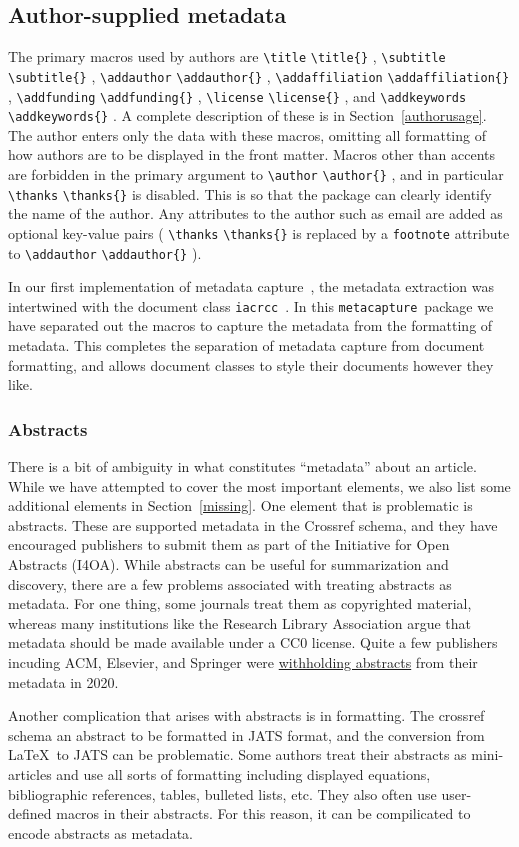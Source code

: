 \documentclass{article}
\newcommand{\pkgname}{\texttt{metacapture}}
\newcommand{\cmd}[2][]{%
  \def\FirstArg{#1}%
  \ifx\FirstArg\empty%
    \texttt{\textbackslash{}#2}%
  \else%
    \texttt{\textbackslash{}#2\{#1\}}%
  \fi
}
\newcommand{\pkg}[1]{\texttt{#1}}
\begin{document}
\subsection{Author-supplied metadata}
The primary macros used by authors are \cmd{title},
\cmd{subtitle}, \cmd{addauthor}, \cmd{addaffiliation},
\cmd{addfunding}, \cmd{license},
and \cmd{addkeywords}.  A complete description of these is in
Section~\ref{authorusage}. The author enters only the data with these
macros, omitting all formatting of how authors are to be displayed in
the front matter.  Macros other than accents are forbidden in the
primary argument to \cmd{author}, and in particular \cmd{thanks} is
disabled. This is so that the package can clearly identify the name of
the author. Any attributes to the author such as email are added as
optional key-value pairs (\cmd{thanks} is replaced by a \pkg{footnote}
attribute to \cmd{addauthor}).

In our first implementation of metadata capture~\cite{tugboat}, the
metadata extraction was intertwined with the document
class \texttt{iacrcc}~\cite{iacrcc}. In this \pkgname\ package we have
separated out the macros to capture the metadata from the formatting
of metadata. This completes the separation of metadata capture from
document formatting, and allows document classes to style their documents
however they like.

\subsubsection{Abstracts}
There is a bit of ambiguity in what constitutes ``metadata'' about an
article. While we have attempted to cover the most important elements,
we also list some additional elements in Section~\ref{missing}. One
element that is problematic is abstracts. These are supported metadata
in the Crossref schema, and they have encouraged publishers to submit
them as part of the Initiative for Open Abstracts (I4OA).  While
abstracts can be useful for summarization and discovery, there are a
few problems associated with treating abstracts as metadata. For
one thing, some
journals treat them as copyrighted material, whereas many institutions
like the Research Library Association argue that metadata should be
made available under a CC0 license. Quite a few publishers incuding
ACM, Elsevier, and Springer
were \href{https://www.crossref.org/blog/open-abstracts-where-are-we/}{withholding
abstracts} from their metadata in 2020.

Another complication that arises with abstracts is in formatting. The
crossref schema an abstract to be formatted in JATS format, and the
conversion from \LaTeX\ to JATS can be problematic. Some authors treat
their abstracts as mini-articles and use all sorts of
formatting including displayed equations, bibliographic references,
tables, bulleted lists, etc. They also often use user-defined macros
in their abstracts. For this reason, it can be compilicated to encode
abstracts as metadata.
\end{document}
